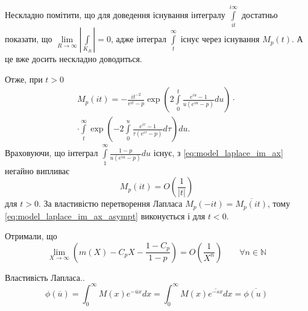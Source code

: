 \begin{lem}
Нескладно помітити, що для доведення існування інтегралу $\int\limits_{it}^{i\infty}$ достатньо показати, що $\lim\limits_{R \rightarrow \infty}|\int\limits_{K_{R}}| = 0$, адже інтеграл $\int\limits_{t}^{\infty}$ існує через існування $M_{p}(t)$.
А це вже досить нескладно доводиться. 

Отже, при $t>0$
\begin{equation}
\label{eq:model_laplace_im_ax}
\begin{split}
M_{p}(it) = -\frac{i t^{-2}}{e^{it}-p} \exp \left(2 \int\limits_{0}^{t} \frac{e^{iu} -1}{u(e^{iu} - p)} du\right) \cdot \\
\cdot \int\limits_t^\infty \exp\left(-2 \int\limits_{0}^{u} \frac{e^{i\tau} -1}{\tau(e^{i\tau} - p)} d\tau\right) du.
\end{split}
\end{equation}
Враховуючи, що інтеграл $\int\limits_{1}^{\infty} \frac{1-p}{u(e^{iu} - p)} du$ існує, з \eqref{eq:model_laplace_im_ax} негайно випливає
\begin{equation}
\label{eq:model_laplace_im_ax_asympt}
M_{p}(it) = O(\frac{1}{|t|})
\end{equation}
для $t > 0$. За властивістю перетворення Лапласа $M_{p}(-it) = \overline{M_{p}(it)}$, тому \eqref{eq:model_laplace_im_ax_asympt} виконується і для $t < 0$.
\end{lem}

Отримали, що
\begin{equation}
\label{eq:uniform_right_as_enhanced}
\lim\limits_{X \rightarrow \infty} \left( m(X) - C_{p} X - \frac{1 - C_{p}}{1 - p} \right) = O\left(\frac{1}{X^{n}}\right) \qquad \forall n \in \mathbb{N}
\end{equation}

Властивість Лапласа..
\begin{equation}
\phi(\overline{u}) = \int_0^\infty M(x) e^{-\overline{u}x} dx = \int_0^\infty M(x) \overline{e^{-sx}} dx = \overline{\phi(u)}
\end{equation}